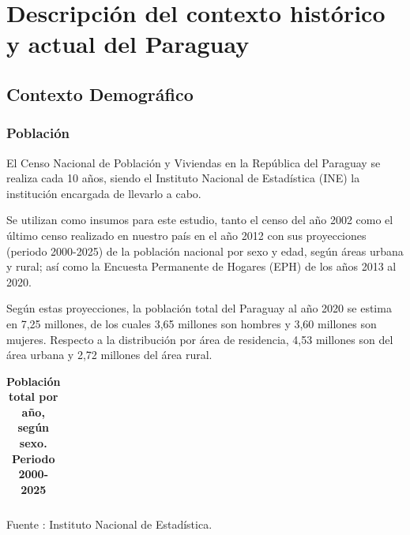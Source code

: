 \section{Descripción del contexto histórico y actual del Paraguay}

\subsection{Contexto Demográfico}\subsubsection{Población}

El Censo Nacional de Población y Viviendas en la República del Paraguay
se realiza cada 10 años, siendo el Instituto Nacional de Estadística
(INE) la institución encargada de llevarlo a cabo.

Se utilizan como insumos para este estudio, tanto el censo del año 2002
como el último censo realizado en nuestro país en el año 2012 con sus
proyecciones (periodo 2000-2025) de la población nacional por sexo y
edad, según áreas urbana y rural; así como la Encuesta Permanente de
Hogares (EPH) de los años 2013 al 2020.

Según estas proyecciones, la población total del Paraguay al año 2020 se
estima en 7,25 millones, de los cuales 3,65 millones son hombres y 3,60
millones son mujeres. Respecto a la distribución por área de residencia,
4,53 millones son del área urbana y 2,72 millones del área rural.

\begin{table}[H]
\begin{center}
\footnotesize
\caption{\bf{Población total por año, según sexo. Periodo 2000-2025}}
\begin{tabular}{l|rrrrrr}

\end{tabular}
                    \item \footnotesize Fuente : Instituto Nacional de Estadística.
\end{center}
\end{table}

